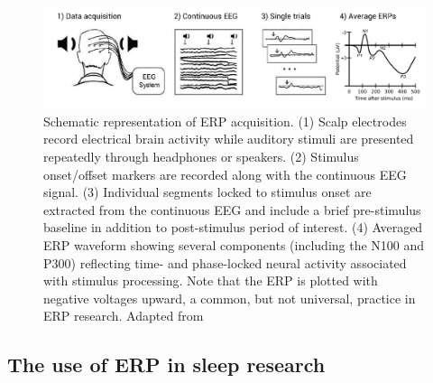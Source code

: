 \begin{figure}[htb]
	\includegraphics[width=\textwidth]{Fig/Methods/ERP/ERP.png}
	\caption[Schematic representation of ERP acquisition]{Schematic representation of ERP acquisition. (1) Scalp electrodes record electrical brain activity while auditory stimuli are presented repeatedly through headphones or speakers. (2) Stimulus onset/offset markers are recorded along with the continuous EEG signal. (3) Individual segments locked to stimulus onset are extracted from the continuous EEG and include a brief pre-stimulus baseline in addition to post-stimulus period of interest. (4) Averaged ERP waveform showing several components (including the N100 and P300) reflecting time- and phase-locked neural activity associated with stimulus processing. Note that the ERP is plotted with negative voltages upward, a common, but not universal, practice in ERP research. Adapted from \citet{key_human_2016}}
	\label{fig:methods:erp}
\end{figure}

\subsection{The use of ERP in sleep research}
\label{sec:eeg:erp:erp}

